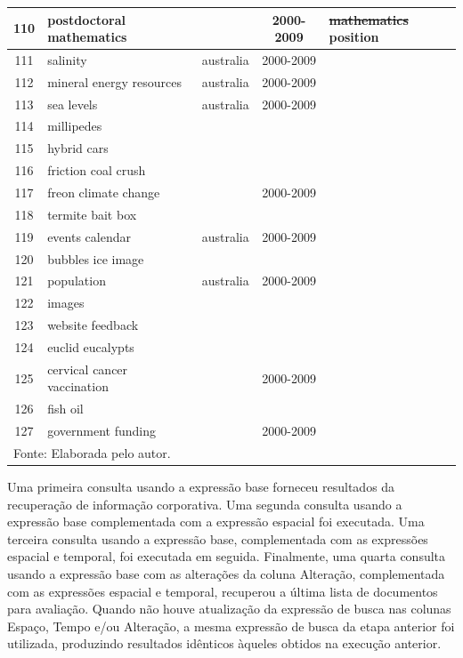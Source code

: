 \begin{center}
\begin{longtable}{c|p{3cm}|c|c|p{3cm}}
110 & postdoctoral mathematics &  & 2000-2009 & \sout{mathematics} position \\ \hline
111 & salinity & australia & 2000-2009 &  \\ \hline
112 & mineral energy resources & australia & 2000-2009 &  \\ \hline
113 & sea levels & australia & 2000-2009 &  \\ \hline
114 & millipedes &  &  &  \\ \hline
115 & hybrid cars &  &  &  \\ \hline
116 & friction coal crush &  &  &  \\ \hline
117 & freon climate change &  & 2000-2009 &  \\ \hline
118 & termite bait box &  &  &  \\ \hline
119 & events calendar & australia & 2000-2009 &  \\ \hline
120 & bubbles ice image &  &  &  \\ \hline
121 & population & australia & 2000-2009 &  \\ \hline
122 & images &  &  &  \\ \hline
123 & website feedback &  &  &  \\ \hline
124 & euclid eucalypts &  &  &  \\ \hline
125 & cervical cancer vaccination &  & 2000-2009 &  \\ \hline
126 & fish oil &  &  &  \\ \hline
127 & government funding &  & 2000-2009 &  \\ \hline




\hline
\hline \multicolumn{5}{l}{Fonte: Elaborada pelo autor.}

\end{longtable}
\end{center}








Uma primeira consulta usando a expressão base forneceu resultados da recuperação de informação corporativa. Uma segunda consulta usando a expressão base complementada com a expressão espacial foi executada. Uma terceira consulta usando a expressão base, complementada com as expressões espacial e temporal, foi executada em seguida. Finalmente, uma quarta consulta usando a expressão base com as alterações da coluna Alteração, complementada com as expressões espacial e temporal, recuperou a última lista de documentos para avaliação. Quando não houve atualização da expressão de busca nas colunas Espaço, Tempo e/ou Alteração, a mesma expressão de busca da etapa anterior foi utilizada, produzindo resultados idênticos àqueles obtidos na execução anterior.

